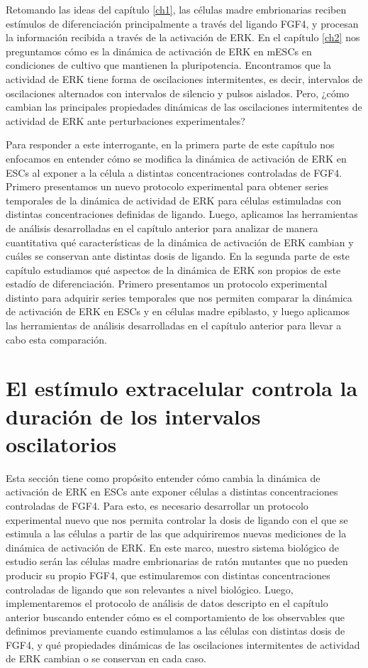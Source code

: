 \documentclass[./main.tex]{subfiles}
\begin{document}
Retomando las ideas del capítulo \ref{ch1}, las células madre embrionarias reciben estímulos de diferenciación principalmente a través del ligando FGF4, y procesan la información recibida a través de la activación de ERK. En el capítulo \ref{ch2} nos preguntamos cómo es la dinámica de activación de ERK en mESCs en condiciones de cultivo que mantienen la pluripotencia. Encontramos que la actividad de ERK tiene forma de oscilaciones intermitentes, es decir, intervalos de oscilaciones alternados con intervalos de silencio y pulsos aislados. Pero, ¿cómo cambian las principales propiedades dinámicas de las oscilaciones intermitentes de actividad de ERK ante perturbaciones experimentales?

Para responder a este interrogante, en la primera parte de este capítulo nos enfocamos en entender cómo se modifica la dinámica de activación de ERK en ESCs al exponer a la célula a distintas concentraciones controladas de FGF4. Primero presentamos un nuevo protocolo experimental para obtener series temporales de la dinámica de actividad de ERK para células estimuladas con distintas concentraciones definidas de ligando. Luego, aplicamos las herramientas de análisis desarrolladas en el capítulo anterior para analizar de manera cuantitativa qué características de la dinámica de activación de ERK cambian y cuáles se conservan ante distintas dosis de ligando. En la segunda parte de este capítulo estudiamos qué aspectos de la dinámica de ERK son propios de este estadío de diferenciación. Primero presentamos un protocolo experimental distinto para adquirir series temporales que nos permiten comparar la dinámica de activación de ERK en ESCs y en células madre epiblasto, y luego aplicamos las herramientas de análisis desarrolladas en el capítulo anterior para llevar a cabo esta comparación. 


\section{El estímulo extracelular controla la duración de los intervalos oscilatorios}

Esta sección tiene como propósito entender cómo cambia la dinámica de activación de ERK en ESCs ante exponer células a distintas concentraciones controladas de FGF4. Para esto, es necesario desarrollar un protocolo experimental nuevo que nos permita controlar la dosis de ligando con el que se estimula a las células a partir de las que adquiriremos nuevas mediciones de la dinámica de activación de ERK. En este marco, nuestro sistema biológico de estudio serán las células madre embrionarias de ratón mutantes que no pueden producir su propio FGF4, que estimularemos con distintas concentraciones controladas de ligando que son relevantes a nivel biológico. Luego, implementaremos el protocolo de análisis de datos descripto en el capítulo anterior buscando entender cómo es el comportamiento de los observables que definimos previamente cuando estimulamos a las células con distintas dosis de FGF4, y qué propiedades dinámicas de las oscilaciones intermitentes de actividad de ERK cambian o se conservan en cada caso. 
\end{document}
